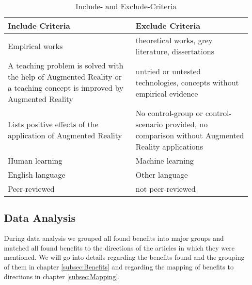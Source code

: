 \begin{table}[!htb]
    \center
    \begin{tabular}{p{17em} | p{17em}}
        \textbf{Include Criteria} & \textbf{Exclude Criteria} \\
        \hline
        Empirical works & theoretical works, grey literature, dissertations \\
        A teaching problem is solved with the help of Augmented Reality or a teaching concept is improved by Augmented Reality & untried or untested technologies, concepts without empirical evidence \\
        Lists positive effects of the application of Augmented Reality & No control-group or control-scenario provided, no comparison without Augmented Reality applications \\
        Human learning & Machine learning \\
        English language & Other language \\
        Peer-reviewed & not peer-reviewed \\
    \end{tabular}
    \caption[Include- and Exclude-Criteria]{Include- and Exclude-Criteria}
    \label{tab:IncludeExcludeCriteria}
\end{table}

\subsection{Data Analysis}
During data analysis we grouped all found benefits into major groups and matched all found benefits to the directions of the articles in which they were mentioned. We will go into details regarding the benefits found and the grouping of them in chapter \ref{subsec:Benefits} and regarding the mapping of benefits to directions in chapter \ref{subsec:Mapping}.